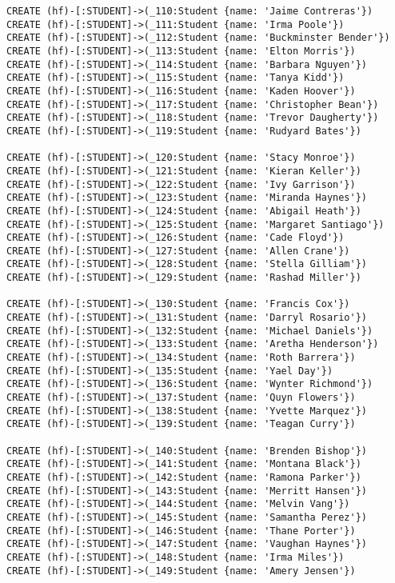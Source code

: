 \begin{lstlisting}
CREATE (hf)-[:STUDENT]->(_110:Student {name: 'Jaime Contreras'})
CREATE (hf)-[:STUDENT]->(_111:Student {name: 'Irma Poole'})
CREATE (hf)-[:STUDENT]->(_112:Student {name: 'Buckminster Bender'})
CREATE (hf)-[:STUDENT]->(_113:Student {name: 'Elton Morris'})
CREATE (hf)-[:STUDENT]->(_114:Student {name: 'Barbara Nguyen'})
CREATE (hf)-[:STUDENT]->(_115:Student {name: 'Tanya Kidd'})
CREATE (hf)-[:STUDENT]->(_116:Student {name: 'Kaden Hoover'})
CREATE (hf)-[:STUDENT]->(_117:Student {name: 'Christopher Bean'})
CREATE (hf)-[:STUDENT]->(_118:Student {name: 'Trevor Daugherty'})
CREATE (hf)-[:STUDENT]->(_119:Student {name: 'Rudyard Bates'})

CREATE (hf)-[:STUDENT]->(_120:Student {name: 'Stacy Monroe'})
CREATE (hf)-[:STUDENT]->(_121:Student {name: 'Kieran Keller'})
CREATE (hf)-[:STUDENT]->(_122:Student {name: 'Ivy Garrison'})
CREATE (hf)-[:STUDENT]->(_123:Student {name: 'Miranda Haynes'})
CREATE (hf)-[:STUDENT]->(_124:Student {name: 'Abigail Heath'})
CREATE (hf)-[:STUDENT]->(_125:Student {name: 'Margaret Santiago'})
CREATE (hf)-[:STUDENT]->(_126:Student {name: 'Cade Floyd'})
CREATE (hf)-[:STUDENT]->(_127:Student {name: 'Allen Crane'})
CREATE (hf)-[:STUDENT]->(_128:Student {name: 'Stella Gilliam'})
CREATE (hf)-[:STUDENT]->(_129:Student {name: 'Rashad Miller'})

CREATE (hf)-[:STUDENT]->(_130:Student {name: 'Francis Cox'})
CREATE (hf)-[:STUDENT]->(_131:Student {name: 'Darryl Rosario'})
CREATE (hf)-[:STUDENT]->(_132:Student {name: 'Michael Daniels'})
CREATE (hf)-[:STUDENT]->(_133:Student {name: 'Aretha Henderson'})
CREATE (hf)-[:STUDENT]->(_134:Student {name: 'Roth Barrera'})
CREATE (hf)-[:STUDENT]->(_135:Student {name: 'Yael Day'})
CREATE (hf)-[:STUDENT]->(_136:Student {name: 'Wynter Richmond'})
CREATE (hf)-[:STUDENT]->(_137:Student {name: 'Quyn Flowers'})
CREATE (hf)-[:STUDENT]->(_138:Student {name: 'Yvette Marquez'})
CREATE (hf)-[:STUDENT]->(_139:Student {name: 'Teagan Curry'})

CREATE (hf)-[:STUDENT]->(_140:Student {name: 'Brenden Bishop'})
CREATE (hf)-[:STUDENT]->(_141:Student {name: 'Montana Black'})
CREATE (hf)-[:STUDENT]->(_142:Student {name: 'Ramona Parker'})
CREATE (hf)-[:STUDENT]->(_143:Student {name: 'Merritt Hansen'})
CREATE (hf)-[:STUDENT]->(_144:Student {name: 'Melvin Vang'})
CREATE (hf)-[:STUDENT]->(_145:Student {name: 'Samantha Perez'})
CREATE (hf)-[:STUDENT]->(_146:Student {name: 'Thane Porter'})
CREATE (hf)-[:STUDENT]->(_147:Student {name: 'Vaughan Haynes'})
CREATE (hf)-[:STUDENT]->(_148:Student {name: 'Irma Miles'})
CREATE (hf)-[:STUDENT]->(_149:Student {name: 'Amery Jensen'})


\end{lstlisting}
